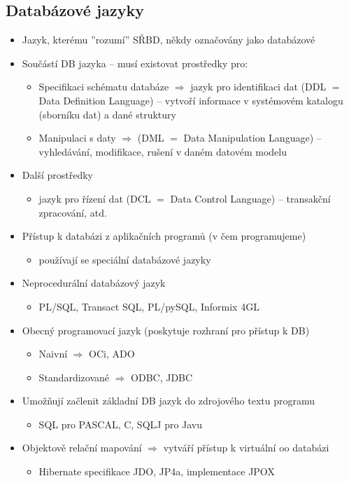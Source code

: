 \documentclass[a4paper,10pt]{article}
\newcommand{\tedy}{$\Rightarrow$ }
\begin{document}
			\subsection{Databázové jazyky}
				\begin{itemize}
					\item Jazyk, kterému ''rozumí'' SŘBD, někdy označovány jako databázové
					\item Součástí DB jazyka -- musí existovat prostředky pro:
					\begin{itemize}
						\item Specifikaci schématu databáze \tedy jazyk pro identifikaci dat (DDL $=$ Data Definition Language) -- vytvoří informace v systémovém katalogu (sborníku dat) a dané struktury
						\item Manipulaci s daty \tedy (DML $=$ Data Manipulation Language) -- vyhledávání, modifikace, rušení v daném datovém modelu
					\end{itemize}

					\item Další prostředky
					\begin{itemize}
						\item jazyk pro řízení dat (DCL $=$ Data Control Language) -- transakční zpracování, atd.
					\end{itemize}

					\item Přístup k databázi z aplikačních programů (v čem programujeme)
					\begin{itemize}
						\item používají se speciální databázové jazyky
					\end{itemize}
					
					\item Neprocedurální databázový jazyk
					\begin{itemize}
						\item PL/SQL, Transact SQL, PL/pySQL, Informix 4GL
					\end{itemize}
					\item Obecný programovací jazyk (poskytuje rozhraní pro přístup k DB)
					\begin{itemize}
						\item Naivní \tedy OCi, ADO
						\item Standardizované \tedy ODBC, JDBC
					\end{itemize}

					\item Umožňují začlenit základní DB jazyk do zdrojového textu programu
					\begin{itemize}
						\item SQL pro PASCAL, C, SQLJ pro Javu
					\end{itemize}

					\item Objektově relační mapování \tedy vytváří přístup k virtuální oo databázi
					\begin{itemize}
						\item Hibernate specifikace JDO, JP4a, implementace JPOX
					\end{itemize}
				\end{itemize}
\end{document}
